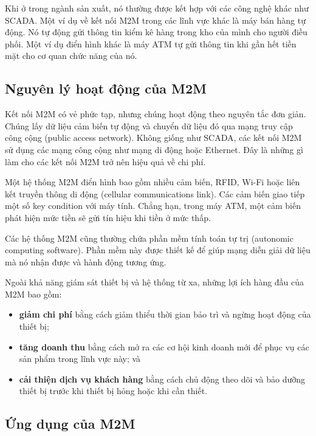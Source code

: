 Khi ở trong ngành sản xuất, nó thường được kết hợp với các công nghệ khác như SCADA. Một ví dụ về kết nối M2M trong các lĩnh vực khác là máy bán hàng tự động. Nó tự động gửi thông tin kiểm kê hàng trong kho của mình cho người điều phối. Một ví dụ điển hình khác là máy ATM tự gửi thông tin khi gần hết tiền mặt cho cơ quan chức năng của nó.

\subsection{Nguyên lý hoạt động của M2M}

Kết nối M2M có vẻ phức tạp, nhưng chúng hoạt động theo nguyên tắc đơn giản. Chúng lấy dữ liệu cảm biến tự động và chuyển dữ liệu đó qua mạng truy cập công cộng (public access network). Không giống như SCADA, các kết nối M2M sử dụng các mạng công cộng như mạng di động hoặc Ethernet. Đây là những gì làm cho các kết nối M2M trở nên hiệu quả về chi phí.

Một hệ thống M2M điển hình bao gồm nhiều cảm biến, RFID, Wi-Fi hoặc liên kết truyền thông di động (cellular communications link). Các cảm biến giao tiếp một số key condition với máy tính. Chẳng hạn, trong máy ATM, một cảm biến phát hiện mức tiền sẽ gửi tín hiệu khi tiền ở mức thấp.

Các hệ thống M2M cũng thường chứa phần mềm tính toán tự trị (autonomic computing software). Phần mềm này được thiết kế để giúp mạng diễn giải dữ liệu mà nó nhận được và hành động tương ứng.

Ngoài khả năng giám sát thiết bị và hệ thống từ xa, những lợi ích hàng đầu của M2M bao gồm:
\begin{itemize}
    \item \textbf{giảm chi phí} bằng cách giảm thiểu thời gian bảo trì và ngừng hoạt động của thiết bị;
    \item \textbf{tăng doanh thu} bằng cách mở ra các cơ hội kinh doanh mới để phục vụ các sản phẩm trong lĩnh vực này; và
    \item \textbf{cải thiện dịch vụ khách hàng} bằng cách chủ động theo dõi và bảo dưỡng thiết bị trước khi thiết bị hỏng hoặc khi cần thiết.
\end{itemize}

\subsection{Ứng dụng của M2M} 


